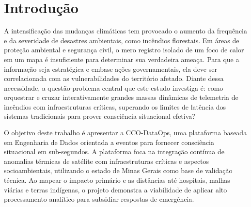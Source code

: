 \section*{Introdução}

A intensificação das mudanças climáticas tem provocado o aumento da frequência e da severidade de desastres ambientais, como incêndios florestais. Em áreas de proteção ambiental e segurança civil, o mero registro isolado de um foco de calor em um mapa é insuficiente para determinar sua verdadeira ameaça. Para que a informação seja estratégica e embase ações governamentais, ela deve ser correlacionada com as vulnerabilidades do território afetado. Diante dessa necessidade, a questão-problema central que este estudo investiga é: como orquestrar e cruzar interativamente grandes massas dinâmicas de telemetria de incêndios com infraestruturas críticas, superando os limites de latência dos sistemas tradicionais para prover consciência situacional efetiva?

O objetivo deste trabalho é apresentar a CCO-DataOps, uma plataforma baseada em Engenharia de Dados orientada a eventos para fornecer consciência situacional em sub-segundos. A plataforma foca na integração contínua de anomalias térmicas de satélite com infraestruturas críticas e aspectos socioambientais, utilizando o estado de Minas Gerais como base de validação técnica. Ao mapear o impacto primário e as distâncias até hospitais, malhas viárias e terras indígenas, o projeto demonstra a viabilidade de aplicar alto processamento analítico para subsidiar respostas de emergência.
